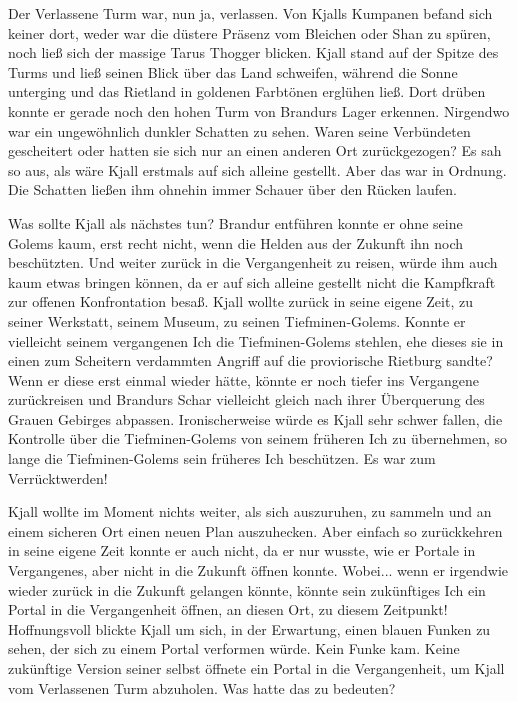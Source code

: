\trennzeichen



Der Verlassene Turm war, nun ja, verlassen. Von Kjalls Kumpanen befand sich keiner dort, weder war die düstere Präsenz vom Bleichen oder Shan zu spüren, noch ließ sich der massige Tarus Thogger blicken. Kjall stand auf der Spitze des Turms und ließ seinen Blick über das Land schweifen, während die Sonne unterging und das Rietland in goldenen Farbtönen erglühen ließ. Dort drüben konnte er gerade noch den hohen Turm von Brandurs Lager erkennen. Nirgendwo war ein ungewöhnlich dunkler Schatten zu sehen. Waren seine Verbündeten gescheitert oder hatten sie sich nur an einen anderen Ort zurückgezogen? Es sah so aus, als wäre Kjall erstmals auf sich alleine gestellt. Aber das war in Ordnung. Die Schatten ließen ihm ohnehin immer Schauer über den Rücken laufen.

Was sollte Kjall als nächstes tun? Brandur entführen konnte er ohne seine Golems kaum, erst recht nicht, wenn die Helden aus der Zukunft ihn noch beschützten. Und weiter zurück in die Vergangenheit zu reisen, würde ihm auch kaum etwas bringen können, da er auf sich alleine gestellt nicht die Kampfkraft zur offenen Konfrontation besaß. Kjall wollte zurück in seine eigene Zeit, zu seiner Werkstatt, seinem Museum, zu seinen Tiefminen-Golems. Konnte er vielleicht seinem vergangenen Ich die Tiefminen-Golems stehlen, ehe dieses sie in einen zum Scheitern verdammten Angriff auf die proviorische Rietburg sandte? Wenn er diese erst einmal wieder hätte, könnte er noch tiefer ins Vergangene zurückreisen und Brandurs Schar vielleicht gleich nach ihrer Überquerung des Grauen Gebirges abpassen. Ironischerweise würde es Kjall sehr schwer fallen, die Kontrolle über die Tiefminen-Golems von seinem früheren Ich zu übernehmen, so lange die Tiefminen-Golems sein früheres Ich beschützen. Es war zum Verrücktwerden!

Kjall wollte im Moment nichts weiter, als sich auszuruhen, zu sammeln und an einem sicheren Ort einen neuen Plan auszuhecken. Aber einfach so zurückkehren in seine eigene Zeit konnte er auch nicht, da er nur wusste, wie er Portale in Vergangenes, aber nicht in die Zukunft öffnen konnte. Wobei... wenn er irgendwie wieder zurück in die Zukunft gelangen könnte, könnte sein zukünftiges Ich ein Portal in die Vergangenheit öffnen, an diesen Ort, zu diesem Zeitpunkt! Hoffnungsvoll blickte Kjall um sich, in der Erwartung, einen blauen Funken zu sehen, der sich zu einem Portal verformen würde. Kein Funke kam. Keine zukünftige Version seiner selbst öffnete ein Portal in die Vergangenheit, um Kjall vom Verlassenen Turm abzuholen. Was hatte das zu bedeuten?

